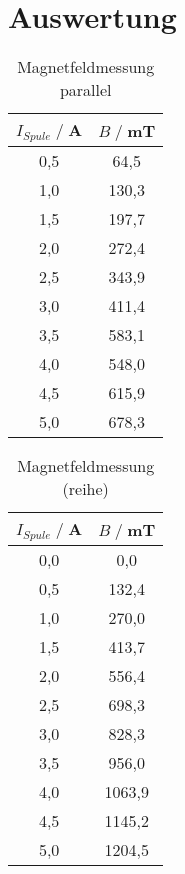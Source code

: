 \newpage
\section{Auswertung}

\begin{table}
    \centering
    \begin{tabular}{c c}
        \toprule
        $I_{Spule} \;/\;$A & $B\;/\;$mT\\
        \midrule
        0,5                 &64,5 \\
        1,0                 &130,3\\
        1,5                 &197,7\\
        2,0                 &272,4\\
        2,5                 &343,9\\
        3,0                 &411,4\\
        3,5                 &583,1\\
        4,0                 &548,0\\
        4,5                 &615,9\\
        5,0                 &678,3\\
        \bottomrule
    \end{tabular}
    \caption{Magnetfeldmessung parallel}
    \label{tab:Bp}
\end{table}

\begin{table}
    \centering
    \begin{tabular}{c c}
        \toprule
        $I_{Spule} \;/\;$A & $B\;/\;$mT\\
        \midrule
        0,0                 &0,0\\
        0,5                 &132,4\\
        1,0                 &270,0\\
        1,5                 &413,7\\
        2,0                 &556,4\\  
        2,5                 &698,3\\
        3,0                 &828,3\\
        3,5                 &956,0\\
        4,0                 &1063,9\\
        4,5                 &1145,2\\
        5,0                 &1204,5\\
        \bottomrule
    \end{tabular}
    \caption{Magnetfeldmessung (reihe)}
    \label{tab:Br}
\end{table}

